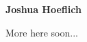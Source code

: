 \documentclass[letterpaper]{article}
\begin{document}
{\LARGE \textbf{Joshua Hoeflich}}

More here soon...
\end{document}

